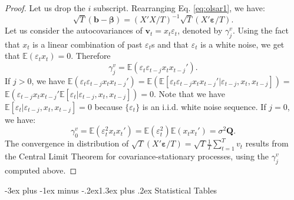 \documentclass[
  11pt,
]{book}
\makeatletter
\renewcommand\section{\@startsection{section}{1}{\z@}
  {-3ex plus -1ex minus -.2ex}{1.3ex plus .2ex}
  {\normalfont\Large\bfseries\color{TextbookInk}}}
\theoremstyle{definition}
\theoremstyle{definition}
\theoremstyle{definition}
\theoremstyle{definition}
\theoremstyle{remark}
\makeatother
\begin{document}
\begin{proof}
Let us drop the \(i\) subscript. Rearranging Eq. \eqref{eq:olsar1}, we have:
\[
\sqrt{T}(\mathbf{b}-\boldsymbol{\beta}) =  (X'X/T)^{-1}\sqrt{T}(X'\boldsymbol\varepsilon/T).
\]
Let us consider the autocovariances of \(\mathbf{v}_t = x_t \varepsilon_t\), denoted by \(\gamma^v_j\). Using the fact that \(x_t\) is a linear combination of past \(\varepsilon_t\)s and that \(\varepsilon_t\) is a white noise, we get that \(\mathbb{E}(\varepsilon_t x_t)=0\). Therefore
\[
\gamma^v_j = \mathbb{E}(\varepsilon_t\varepsilon_{t-j}x_tx_{t-j}').
\]
If \(j>0\), we have \(\mathbb{E}(\varepsilon_t\varepsilon_{t-j}x_tx_{t-j}')=\mathbb{E}(\mathbb{E}[\varepsilon_t\varepsilon_{t-j}x_tx_{t-j}'|\varepsilon_{t-j},x_t,x_{t-j}])=\) \(\mathbb{E}(\varepsilon_{t-j}x_tx_{t-j}'\mathbb{E}[\varepsilon_t|\varepsilon_{t-j},x_t,x_{t-j}])=0\). Note that we have \(\mathbb{E}[\varepsilon_t|\varepsilon_{t-j},x_t,x_{t-j}]=0\) because \(\{\varepsilon_t\}\) is an i.i.d. white noise sequence. If \(j=0\), we have:
\[
\gamma^v_0 = \mathbb{E}(\varepsilon_t^2x_tx_{t}')= \mathbb{E}(\varepsilon_t^2) \mathbb{E}(x_tx_{t}')=\sigma^2\mathbf{Q}.
\]
The convergence in distribution of \(\sqrt{T}(X'\boldsymbol\varepsilon/T)=\sqrt{T}\frac{1}{T}\sum_{t=1}^Tv_t\) results from the Central Limit Theorem for covariance-stationary processes, using the \(\gamma_j^v\) computed above.
\end{proof}

\section{Statistical Tables}\label{statistical-tables}
\end{document}
